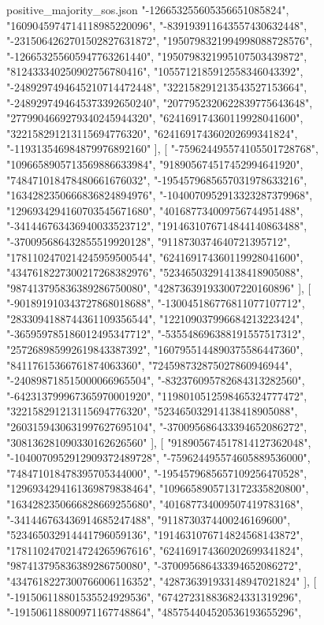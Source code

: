 \begin{filecontents*}[overwrite]{positive_majority_sos.json}
    "-126653255605356651085824",
    "1609045974714118985220096",
    "-839193911643557430632448",
    "-2315064262701502827631872",
    "1950798321994998088728576",
    "-126653255605947763261440",
    "1950798321995107503439872",
    "812433340250902756780416",
    "1055712185912558346043392",
    "-2489297494645210714472448",
    "322158291213543527153664",
    "-2489297494645373392650240",
    "2077952320622839775643648",
    "2779904669279340245944320",
    "624169174360119928041600",
    "322158291213115694776320",
    "624169174360202699341824",
    "-119313546984879976892160"
   ],
   [
    "-759624495574105501728768",
    "1096658905713569886633984",
    "918905674517452994641920",
    "748471018478480661676032",
    "-1954579685657031978633216",
    "1634282350666836824894976",
    "-1040070952913323287379968",
    "1296934294160703545671680",
    "401687734009756744951488",
    "-341446763436940033523712",
    "1914631076714844140863488",
    "-370095686432855519920128",
    "9118730374640721395712",
    "1781102470214245959500544",
    "624169174360119928041600",
    "4347618227300217268382976",
    "523465032914138418905088",
    "987413795836389286750080",
    "428736391933007220160896"
   ],
   [
    "-901891910343727868018688",
    "-130045186776811077107712",
    "2833094188744361109356544",
    "122109037996684213223424",
    "-365959785186012495347712",
    "-535548696388191557517312",
    "257268985992619843387392",
    "1607955144890375586447360",
    "84117615366761874063360",
    "724598732875027860946944",
    "-240898718515000066965504",
    "-832376095782684313282560",
    "-642313799967365970001920",
    "1198010512598465324777472",
    "322158291213115694776320",
    "523465032914138418905088",
    "2603159430631997627695104",
    "-370095686433394652086272",
    "308136281090330162626560"
   ],
   [
    "918905674517814127362048",
    "-1040070952912909372489728",
    "-759624495574605889536000",
    "748471018478395705344000",
    "-1954579685657109256470528",
    "1296934294161369879838464",
    "1096658905713172335820800",
    "1634282350666828669255680",
    "401687734009507419783168",
    "-341446763436914685247488",
    "9118730374400246169600",
    "523465032914441796059136",
    "1914631076714824568143872",
    "1781102470214724265967616",
    "624169174360202699341824",
    "987413795836389286750080",
    "-370095686433394652086272",
    "4347618227300766006116352",
    "428736391933148947021824"
   ],
   [
    "-191506118801535524929536",
    "674272318836824331319296",
    "-191506118800971167748864",
    "485754404520536193655296",

\end{filecontents*}
